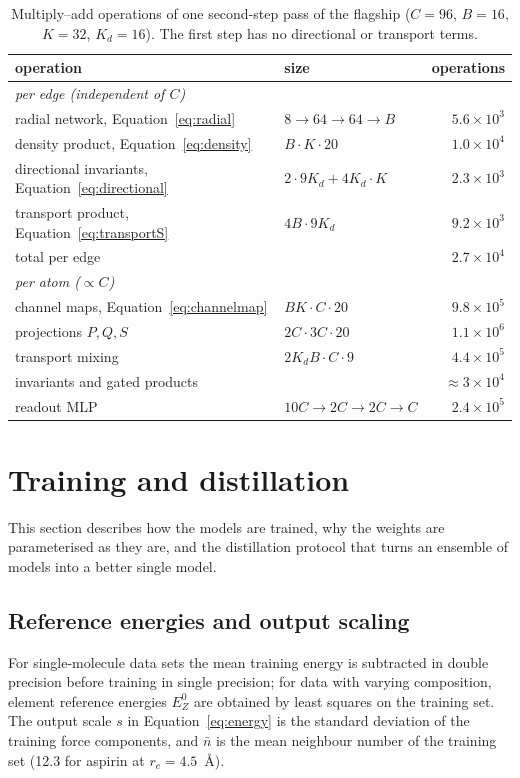 \documentclass[journal=jctcce,manuscript=article,layout=traditional]{achemso}
\begin{document}
\begin{table}
\caption{Multiply--add operations of one second-step pass of the flagship ($C=96$, $B=16$, $K=32$, $K_d=16$). The
first step has no directional or transport terms.}
\label{tab:costmodel}
\small
\begin{tabular}{llr}
\toprule
operation & size & operations \\
\midrule
\multicolumn{3}{l}{\emph{per edge (independent of $C$)}} \\
radial network, Equation~\ref{eq:radial} & $8\to64\to64\to B$ & $5.6\times10^3$ \\
density product, Equation~\ref{eq:density} & $B\cdot K\cdot20$ & $1.0\times10^4$ \\
directional invariants, Equation~\ref{eq:directional} & $2\cdot9K_d+4K_d\cdot K$ & $2.3\times10^3$ \\
transport product, Equation~\ref{eq:transportS} & $4B\cdot9K_d$ & $9.2\times10^3$ \\
total per edge & & $2.7\times10^4$ \\
\midrule
\multicolumn{3}{l}{\emph{per atom ($\propto C$)}} \\
channel maps, Equation~\ref{eq:channelmap} & $BK\cdot C\cdot20$ & $9.8\times10^5$ \\
projections $P,Q,S$ & $2C\cdot3C\cdot20$ & $1.1\times10^6$ \\
transport mixing & $2K_dB\cdot C\cdot9$ & $4.4\times10^5$ \\
invariants and gated products & & $\approx3\times10^4$ \\
readout MLP & $10C\to2C\to2C\to C$ & $2.4\times10^5$ \\
\bottomrule
\end{tabular}
\end{table}

\section{Training and distillation}
\label{sec:training}
This section describes how the models are trained, why the weights are parameterised as they are, and the
distillation protocol that turns an ensemble of models into a better single model.

\subsection{Reference energies and output scaling}
For single-molecule data sets the mean training energy is subtracted in
double precision before training in single precision; for data with varying composition, element reference energies
$E^0_Z$ are obtained by least squares on the training set. The output scale $s$ in Equation~\ref{eq:energy} is the
standard deviation of the training force components, and $\bar n$ is the mean neighbour number of the training set
(12.3 for aspirin at $r_c=4.5$~\AA).
\end{document}
